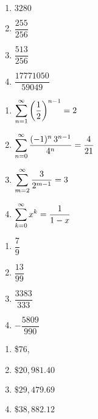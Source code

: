 \begin{multicols}{4}
\begin{enumerate}
\setcounter{enumi}{\value{HW}}

\item  $3280$

\item  $\dfrac{255}{256}$



\item $\dfrac{513}{256}$

\item $\dfrac{17771050}{59049}$

\setcounter{HW}{\value{enumi}}
\end{enumerate}
\end{multicols}

\begin{multicols}{4}
\begin{enumerate}
\setcounter{enumi}{\value{HW}}

\item $\displaystyle{ \sum_{n = 1}^{\infty} \left( \frac{1}{2} \right)^{n-1} = 2}$  
\item $\displaystyle{ \sum_{n = 0}^{\infty}  \dfrac{(-1)^n \, 3^{n-1}}{4^{n}} = \frac{4}{21}}$ 
\item $\displaystyle{ \sum_{m = 2}^{\infty}   \dfrac{3}{2^{m-1}} = 3}$ 
\item $\displaystyle{ \sum_{k =0}^{\infty}  x^{k} = \frac{1}{1-x}}$
\setcounter{HW}{\value{enumi}}
\end{enumerate}
\end{multicols}



\begin{multicols}{4}
\begin{enumerate}
\setcounter{enumi}{\value{HW}}



\item $\dfrac{7}{9}$

\item $\dfrac{13}{99}$


\item $\dfrac{3383}{333}$
\item $-\dfrac{5809}{990}$

\setcounter{HW}{\value{enumi}}
\end{enumerate}
\end{multicols}



\begin{multicols}{4}
\begin{enumerate}
\setcounter{enumi}{\value{HW}}

\item \$76,
\item $\$20,\!981.40$

\item $\$29,\!479.69$

\item  $\$38,\!882.12$ 

\setcounter{HW}{\value{enumi}}
\end{enumerate}
\end{multicols}

